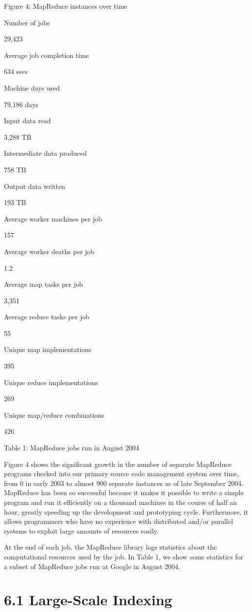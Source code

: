 \documentclass[
]{article}
\begin{document}
Figure 4: MapReduce instances over time

Number of jobs

29,423

Average job completion time

634 secs

Machine days used

79,186 days

Input data read

3,288 TB

Intermediate data produced

758 TB

Output data written

193 TB

Average worker machines per job

157

Average worker deaths per job

1.2

Average map tasks per job

3,351

Average reduce tasks per job

55

Unique map implementations

395

Unique reduce implementations

269

Unique map/reduce combinations

426

Table 1: MapReduce jobs run in August 2004

Figure 4 shows the significant growth in the number of separate
MapReduce programs checked into our primary source code management
system over time, from 0 in early 2003 to almost 900 separate instances
as of late September 2004. MapReduce has been so successful because it
makes it possible to write a simple program and run it efficiently on a
thousand machines in the course of half an hour, greatly speeding up the
development and prototyping cycle. Furthermore, it allows programmers
who have no experience with distributed and/or parallel systems to
exploit large amounts of resources easily.

At the end of each job, the MapReduce library logs statistics about the
computational resources used by the job. In Table 1, we show some
statistics for a subset of MapReduce jobs run at Google in August 2004.

\section{6.1 Large-Scale Indexing}\label{large-scale-indexing}
\end{document}
